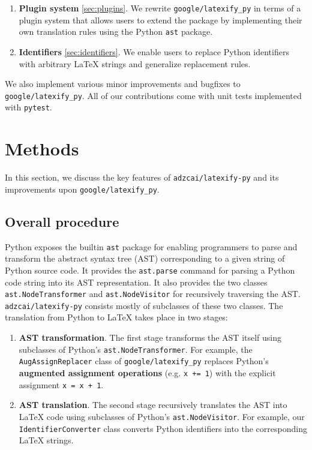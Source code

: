 \documentclass{article}
\newcommand{\ourpkg}{\texttt{adzcai/latexify-py}}
\newcommand{\theirpkg}{\texttt{google/latexify\_py}}
\newcommand{\vocab}[1]{\textbf{#1}}
\begin{document}
\begin{enumerate}
    \item \vocab{Plugin system} \ref{sec:plugins}. We rewrite \theirpkg{} in terms of a plugin system
        that allows users to extend the package by implementing their own translation rules using the Python \verb|ast| package.
    \item \vocab{Identifiers} \ref{sec:identifiers}.
        We enable users to replace Python identifiers with arbitrary \LaTeX{} strings and generalize replacement rules.
\end{enumerate}

We also implement various minor improvements and bugfixes to \theirpkg{}.
All of our contributions come with unit tests implemented with \verb|pytest|.


\section{Methods}

In this section,
we discuss the key features of \ourpkg{}
and its improvements upon \theirpkg{}.

\subsection{Overall procedure}

Python exposes the builtin \verb|ast| package for enabling programmers to parse and transform the abstract syntax tree (AST) corresponding to a given string of Python source code.
It provides the \verb|ast.parse| command for parsing a Python code string into its AST representation.
It also provides the two classes \verb|ast.NodeTransformer| and \verb|ast.NodeVisitor| for recursively traversing the AST.
\ourpkg{} consists mostly of subclasses of these two classes.
The translation from Python to \LaTeX{} takes place in two stages:

\begin{enumerate}

    \item \vocab{AST transformation}.
        The first stage transforms the AST itself using subclasses of Python's \verb|ast.NodeTransformer|.
        For example, the \verb|AugAssignReplacer| class of \theirpkg{} replaces Python's \vocab{augmented assignment operations} (e.g. \verb|x += 1|) with the explicit assignment \verb|x = x + 1|.

    \item \vocab{AST translation}.
        The second stage recursively translates the AST into \LaTeX{} code using subclasses of Python's \verb|ast.NodeVisitor|.
        For example, our \verb|IdentifierConverter| class converts Python identifiers into the corresponding LaTeX strings.

\end{enumerate}
\end{document}
